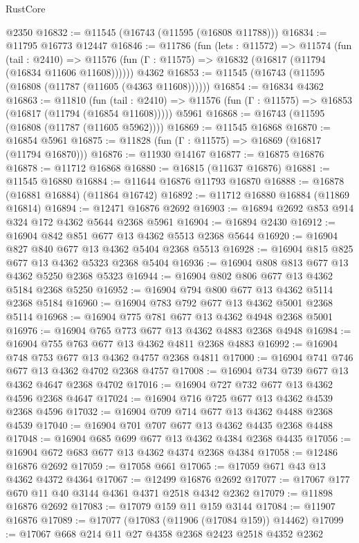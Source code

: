 \begin{lexlean}{RustCore}
\begin{coremodule}
    @2350
@16832 := @11545 (@16743 (@11595 (@16808 @11788)))
@16834 := @11795 @16773 @12447
@16846 := @11786
    (fun (lets : @11572) =>
    @11574
      (fun (tail : @2410) =>
      @11576 (fun (Γ : @11575) => @16832 (@16817 (@11794 (@16834 @11606 @11608))))))
    @4362
@16853 := @11545 (@16743 (@11595 (@16808 (@11787 (@11605 (@4363 @11608))))))
@16854 := @16834 @4362
@16863 := @11810
    (fun (tail : @2410) => @11576 (fun (Γ : @11575) => @16853 (@16817 (@11794 (@16854 @11608)))))
    @5961
@16868 := @16743 (@11595 (@16808 (@11787 (@11605 @5962))))
@16869 := @11545 @16868
@16870 := @16854 @5961
@16875 := @11828 (fun (Γ : @11575) => @16869 (@16817 (@11794 @16870)))
@16876 := @11930 @14167
@16877 := @16875 @16876
@16878 := @11712 @16868
@16880 := @16815 (@11637 @16876)
@16881 := @11545 @16880
@16884 := @11644 @16876 @11793 @16870
@16888 := @16878 (@16881 @16884) (@11864 @16742)
@16892 := @11712 @16880 @16884 (@11869 @16814)
@16894 := @12471 @16876 @2692
@16903 := @16894 @2692 @853 @914 @324 @172 @4362 @5644 @2368 @5961
@16904 := @16894 @2430
@16912 := @16904 @842 @851 @677 @13 @4362 @5513 @2368 @5644
@16920 := @16904 @827 @840 @677 @13 @4362 @5404 @2368 @5513
@16928 := @16904 @815 @825 @677 @13 @4362 @5323 @2368 @5404
@16936 := @16904 @808 @813 @677 @13 @4362 @5250 @2368 @5323
@16944 := @16904 @802 @806 @677 @13 @4362 @5184 @2368 @5250
@16952 := @16904 @794 @800 @677 @13 @4362 @5114 @2368 @5184
@16960 := @16904 @783 @792 @677 @13 @4362 @5001 @2368 @5114
@16968 := @16904 @775 @781 @677 @13 @4362 @4948 @2368 @5001
@16976 := @16904 @765 @773 @677 @13 @4362 @4883 @2368 @4948
@16984 := @16904 @755 @763 @677 @13 @4362 @4811 @2368 @4883
@16992 := @16904 @748 @753 @677 @13 @4362 @4757 @2368 @4811
@17000 := @16904 @741 @746 @677 @13 @4362 @4702 @2368 @4757
@17008 := @16904 @734 @739 @677 @13 @4362 @4647 @2368 @4702
@17016 := @16904 @727 @732 @677 @13 @4362 @4596 @2368 @4647
@17024 := @16904 @716 @725 @677 @13 @4362 @4539 @2368 @4596
@17032 := @16904 @709 @714 @677 @13 @4362 @4488 @2368 @4539
@17040 := @16904 @701 @707 @677 @13 @4362 @4435 @2368 @4488
@17048 := @16904 @685 @699 @677 @13 @4362 @4384 @2368 @4435
@17056 := @16904 @672 @683 @677 @13 @4362 @4374 @2368 @4384
@17058 := @12486 @16876 @2692
@17059 := @17058 @661
@17065 := @17059 @671 @43 @13 @4362 @4372 @4364
@17067 := @12499 @16876 @2692
@17077 := @17067 @177 @670 @11 @40 @3144 @4361 @4371 @2518 @4342 @2362
@17079 := @11898 @16876 @2692
@17083 := @17079 @159 @11 @159 @3144
@17084 := @11907 @16876
@17089 := @17077 (@17083 (@11906 (@17084 @159)) @14462)
@17099 := @17067 @668 @214 @11 @27 @4358 @2368 @2423 @2518 @4352 @2362

\end{coremodule}
\end{lexlean}
